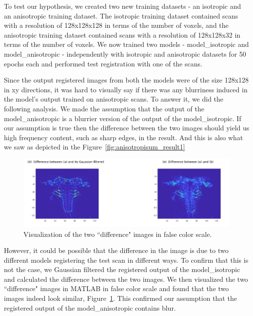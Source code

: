 \documentclass{book}
\begin{document}
	To test our hypothesis, we created two new training datasets - an isotropic and an anisotropic training dataset. The isotropic training dataset contained scans with a resolution of 128x128x128 in terms of the number of voxels, and the anisotropic training dataset contained scans with a resolution of 128x128x32 in terms of the number of voxels. We now trained two models - model\_isotropic and model\_anisotropic - independently with isotropic and anisotropic datasets for 50 epochs each and performed test registration with one of the scans.
	
	Since the output registered images from both the models were of the size 128x128 in xy directions, it was hard to visually say if there was any blurriness induced in the model's output trained on anisotropic scans. To answer it, we did the following analysis. We made the assumption that the output of the model\_anisotropic is a blurrier version of the output of the model\_isotropic. If our assumption is true then the difference between the two images should yield us high frequency content, such as sharp edges, in the result. And this is also what we saw as depicted in the Figure~\ref{fig:anisotropisum_result1}
	
	\begin{figure}[H]
		\centering
		\includegraphics[width=0.7\columnwidth]{resources/discussion/anisotropic_effect/Result_2.png}
		\caption{Visualization of the two ``difference" images in false color scale.}
		\label{fig:anisotropisum_result2}
	\end{figure}
	
	However, it could be possible that the difference in the image is due to two different models registering the test scan in different ways. To confirm that this is not the case, we Gaussian filtered the registered output of the model\_isotropic and calculated the difference between the two images. We then visualized the two ``difference" images in MATLAB in false color scale and found that the two images indeed look similar, Figure~\ref{fig:anisotropisum_result2}. This confirmed our assumption that the registered output of the model\_anisotropic contains blur.
	
	
\end{document}
